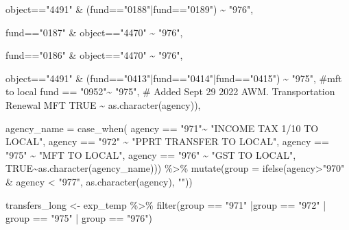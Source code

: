 \documentclass[
  letterpaper,
  DIV=11,
  numbers=noendperiod]{scrreport}
\newenvironment{Shaded}{\begin{snugshade}}{\end{snugshade}}
\newcommand{\AttributeTok}[1]{\textcolor[rgb]{0.40,0.45,0.13}{#1}}
\newcommand{\CommentTok}[1]{\textcolor[rgb]{0.37,0.37,0.37}{#1}}
\newcommand{\ConstantTok}[1]{\textcolor[rgb]{0.56,0.35,0.01}{#1}}
\newcommand{\FunctionTok}[1]{\textcolor[rgb]{0.28,0.35,0.67}{#1}}
\newcommand{\NormalTok}[1]{\textcolor[rgb]{0.00,0.23,0.31}{#1}}
\newcommand{\OtherTok}[1]{\textcolor[rgb]{0.00,0.23,0.31}{#1}}
\newcommand{\SpecialCharTok}[1]{\textcolor[rgb]{0.37,0.37,0.37}{#1}}
\newcommand{\StringTok}[1]{\textcolor[rgb]{0.13,0.47,0.30}{#1}}
\begin{document}
\begin{Shaded}
\begin{Highlighting}[]
\NormalTok{      object}\SpecialCharTok{==}\StringTok{"4491"} \SpecialCharTok{\&}\NormalTok{ (fund}\SpecialCharTok{==}\StringTok{"0188"}\SpecialCharTok{|}\NormalTok{fund}\SpecialCharTok{==}\StringTok{"0189"}\NormalTok{) }\SpecialCharTok{\textasciitilde{}} \StringTok{"976"}\NormalTok{,}
      
\NormalTok{      fund}\SpecialCharTok{==}\StringTok{"0187"} \SpecialCharTok{\&}\NormalTok{ object}\SpecialCharTok{==}\StringTok{"4470"} \SpecialCharTok{\textasciitilde{}} \StringTok{"976"}\NormalTok{,}
      
\NormalTok{      fund}\SpecialCharTok{==}\StringTok{"0186"} \SpecialCharTok{\&}\NormalTok{ object}\SpecialCharTok{==}\StringTok{"4470"} \SpecialCharTok{\textasciitilde{}} \StringTok{"976"}\NormalTok{,}
      
\NormalTok{      object}\SpecialCharTok{==}\StringTok{"4491"} \SpecialCharTok{\&}\NormalTok{ (fund}\SpecialCharTok{==}\StringTok{"0413"}\SpecialCharTok{|}\NormalTok{fund}\SpecialCharTok{==}\StringTok{"0414"}\SpecialCharTok{|}\NormalTok{fund}\SpecialCharTok{==}\StringTok{"0415"}\NormalTok{)  }\SpecialCharTok{\textasciitilde{}} \StringTok{"975"}\NormalTok{, }\CommentTok{\#mft to local}
\NormalTok{      fund }\SpecialCharTok{==} \StringTok{"0952"}\SpecialCharTok{\textasciitilde{}} \StringTok{"975"}\NormalTok{, }\CommentTok{\# Added Sept 29 2022 AWM. Transportation Renewal MFT}
      \ConstantTok{TRUE} \SpecialCharTok{\textasciitilde{}} \FunctionTok{as.character}\NormalTok{(agency)),}
    
    \AttributeTok{agency\_name =} \FunctionTok{case\_when}\NormalTok{(}
\NormalTok{      agency }\SpecialCharTok{==} \StringTok{"971"}\SpecialCharTok{\textasciitilde{}} \StringTok{"INCOME TAX 1/10 TO LOCAL"}\NormalTok{,}
\NormalTok{      agency }\SpecialCharTok{==} \StringTok{"972"} \SpecialCharTok{\textasciitilde{}} \StringTok{"PPRT TRANSFER TO LOCAL"}\NormalTok{,}
\NormalTok{      agency }\SpecialCharTok{==} \StringTok{"975"} \SpecialCharTok{\textasciitilde{}} \StringTok{"MFT TO LOCAL"}\NormalTok{,}
\NormalTok{      agency }\SpecialCharTok{==} \StringTok{"976"} \SpecialCharTok{\textasciitilde{}} \StringTok{"GST TO LOCAL"}\NormalTok{,}
      \ConstantTok{TRUE}\SpecialCharTok{\textasciitilde{}}\FunctionTok{as.character}\NormalTok{(agency\_name))) }\SpecialCharTok{\%\textgreater{}\%} 
  \FunctionTok{mutate}\NormalTok{(}\AttributeTok{group =} \FunctionTok{ifelse}\NormalTok{(agency}\SpecialCharTok{\textgreater{}}\StringTok{"970"} \SpecialCharTok{\&}\NormalTok{ agency }\SpecialCharTok{\textless{}} \StringTok{"977"}\NormalTok{, }\FunctionTok{as.character}\NormalTok{(agency), }\StringTok{""}\NormalTok{))}


\NormalTok{transfers\_long }\OtherTok{\textless{}{-}}\NormalTok{ exp\_temp }\SpecialCharTok{\%\textgreater{}\%} 
  \FunctionTok{filter}\NormalTok{(group }\SpecialCharTok{==} \StringTok{"971"} \SpecialCharTok{|}\NormalTok{group }\SpecialCharTok{==} \StringTok{"972"} \SpecialCharTok{|}\NormalTok{ group }\SpecialCharTok{==} \StringTok{"975"} \SpecialCharTok{|}\NormalTok{ group }\SpecialCharTok{==} \StringTok{"976"}\NormalTok{)}
\end{Highlighting}
\end{Shaded}
\end{document}
